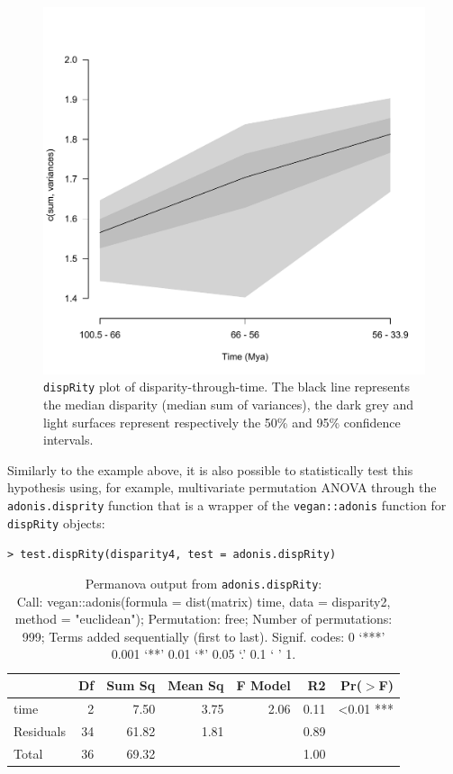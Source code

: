 \documentclass[12pt,letterpaper]{article}
\newcommand{\disp}{\texttt{dispRity} }
\begin{document}
\begin{figure}[!htbp]
\centering
   \includegraphics[width=1\textwidth]{plot_example_time.pdf} 
\caption{\disp plot of disparity-through-time. The black line represents the median disparity (median sum of variances), the dark grey and light surfaces represent respectively the 50\% and 95\% confidence intervals.}
\label{Fig:plot_time}
\end{figure}

Similarly to the example above, it is also possible to statistically test this hypothesis using, for example, multivariate permutation ANOVA  \citep[PERMANOVA; ][]{permanova} through the \texttt{adonis.disprity} function that is a wrapper of the \texttt{vegan::adonis} function  \citep{oksanen2007vegan} for \texttt{dispRity} objects:

\noindent \texttt{> test.dispRity(disparity4, test = adonis.dispRity)}

\begin{table}[ht]
\centering
\begin{tabular}{lrrrrrr}
  \hline
              & Df & Sum Sq & Mean Sq & F Model & R2   & Pr($>$F) \\ 
  \hline
    time      & 2  &  7.50 & 3.75     & 2.06    & 0.11 & <0.01 *** \\ 
    Residuals & 34 & 61.82 & 1.81     &         & 0.89 & \\
    Total     & 36 & 69.32 &          &         & 1.00 & \\ 
   \hline
\end{tabular}
\caption{
Permanova output from \texttt{adonis.dispRity}:\\
Call: vegan::adonis(formula = dist(matrix) \texttildelow time, data = disparity2, method = "euclidean"); Permutation: free; Number of permutations: 999; Terms added sequentially (first to last). Signif. codes:  0 `***' 0.001 `**' 0.01 `*' 0.05 `.' 0.1 ` ' 1.
}
\label{Tab:anova}
\end{table}
\end{document}

